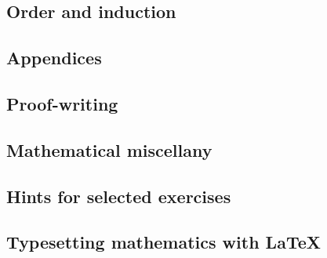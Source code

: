\documentclass[10pt]{book}
\begin{document}
\chapter{Order and induction}
    \label{chOrderInduction}
    

\appendix
\begin{appendices}
\renewcommand{\sectionmark}[1]{\markboth{\leftmark}{Section \thesection.\ #1}}
\renewcommand{\chaptermark}[1]{\markboth{Appendix \thechapter.\ #1}{\rightmark}}

\part*{Appendices}

\chapter{Proof-writing}
    \label{apxWriting}
    \renewcommand\chaptername{Proof-writing}
    

\chapter{Mathematical miscellany}    
    \label{apxMiscellany}
    \renewcommand\chaptername{Mathematical miscellany}
    

\chapter{Hints for selected exercises}
    \label{apxHints}
    \renewcommand\chaptername{Hints to selected exercises}
    

\chapter{Typesetting mathematics with \LaTeX{}}
    \label{apxLaTeX}
    \renewcommand\chaptername{Typesetting mathematics with \LaTeX{}}
    

\end{appendices}
\end{document}

